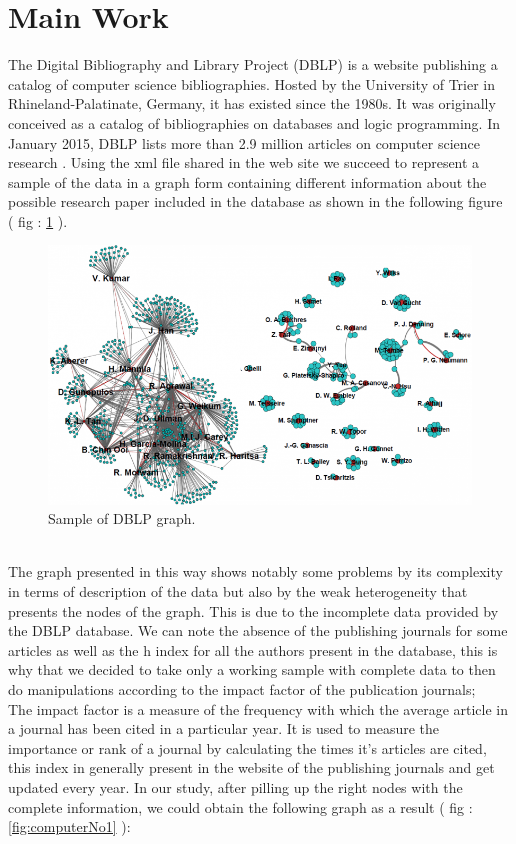 \documentclass[times, twoside]{zHenriquesLab-StyleBioRxiv}
\begin{document}
\section*{Main Work}
The Digital Bibliography and Library Project (DBLP) is a website publishing a catalog of computer science bibliographies. Hosted by the University of Trier in Rhineland-Palatinate, Germany, it has existed since the 1980s. It was originally conceived as a catalog of bibliographies on databases and logic programming. In January 2015, DBLP lists more than 2.9 million articles on computer science research \cite{dbpl}. Using the xml file shared in the web site we succeed to represent a sample of the data in a graph form containing different information about the possible research paper included in the database as shown in the following figure ( fig : \ref{fig:computerNo0} ). \begin{figure}[h]
\centering
\includegraphics[width=.8\linewidth]{Figures/Figure_1}
\caption{Sample of DBLP graph.}
\label{fig:computerNo0}
\end{figure}
\\The graph presented in this way shows notably some problems by its complexity in terms of description of the data but also by the weak heterogeneity that presents the nodes of the graph. This is due to the incomplete data provided by the DBLP database. We can note the absence of the publishing journals for some articles as well as the h index for all the authors present in the database, this is why that we decided to take only a working sample with complete data to then do manipulations according to the impact factor of the publication journals;\\
The impact factor is a measure of the frequency with which the average article in a journal has been cited in a particular year. It is used to measure the importance or rank of a journal by calculating the times it's articles are cited, this index in generally present in the website of the publishing journals and get updated every year. In our study, after pilling up the right nodes with the complete information, we could obtain the following graph as a result ( fig : \ref{fig:computerNo1} ):
\end{document}

